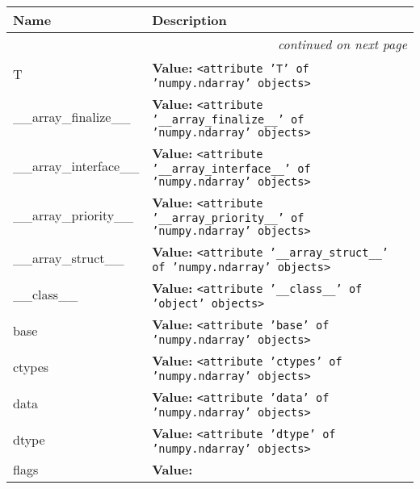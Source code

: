 \begin{longtable}{|p{}|p{}|l}
\cline{1-2}
\cline{1-2} \centering \textbf{Name} & \centering \textbf{Description}& \\
\cline{1-2}
\endhead\cline{1-2}\multicolumn{3}{r}{\small\textit{continued on next page}}\\\endfoot\cline{1-2}
\endlastfoot\raggedright T\- & \raggedright \textbf{Value:} 
{\tt {\textless}attribute 'T' of 'numpy.ndarray' objects{\textgreater}}&\\
\cline{1-2}
\raggedright \_\-\_\-a\-r\-r\-a\-y\-\_\-f\-i\-n\-a\-l\-i\-z\-e\-\_\-\_\- & \raggedright \textbf{Value:} 
{\tt {\textless}attribute '\_\_array\_finalize\_\_' of 'numpy.ndarray' objects{\textgreater}}&\\
\cline{1-2}
\raggedright \_\-\_\-a\-r\-r\-a\-y\-\_\-i\-n\-t\-e\-r\-f\-a\-c\-e\-\_\-\_\- & \raggedright \textbf{Value:} 
{\tt {\textless}attribute '\_\_array\_interface\_\_' of 'numpy.ndarray' objects{\textgreater}}&\\
\cline{1-2}
\raggedright \_\-\_\-a\-r\-r\-a\-y\-\_\-p\-r\-i\-o\-r\-i\-t\-y\-\_\-\_\- & \raggedright \textbf{Value:} 
{\tt {\textless}attribute '\_\_array\_priority\_\_' of 'numpy.ndarray' objects{\textgreater}}&\\
\cline{1-2}
\raggedright \_\-\_\-a\-r\-r\-a\-y\-\_\-s\-t\-r\-u\-c\-t\-\_\-\_\- & \raggedright \textbf{Value:} 
{\tt {\textless}attribute '\_\_array\_struct\_\_' of 'numpy.ndarray' objects{\textgreater}}&\\
\cline{1-2}
\raggedright \_\-\_\-c\-l\-a\-s\-s\-\_\-\_\- & \raggedright \textbf{Value:} 
{\tt {\textless}attribute '\_\_class\_\_' of 'object' objects{\textgreater}}&\\
\cline{1-2}
\raggedright b\-a\-s\-e\- & \raggedright \textbf{Value:} 
{\tt {\textless}attribute 'base' of 'numpy.ndarray' objects{\textgreater}}&\\
\cline{1-2}
\raggedright c\-t\-y\-p\-e\-s\- & \raggedright \textbf{Value:} 
{\tt {\textless}attribute 'ctypes' of 'numpy.ndarray' objects{\textgreater}}&\\
\cline{1-2}
\raggedright d\-a\-t\-a\- & \raggedright \textbf{Value:} 
{\tt {\textless}attribute 'data' of 'numpy.ndarray' objects{\textgreater}}&\\
\cline{1-2}
\raggedright d\-t\-y\-p\-e\- & \raggedright \textbf{Value:} 
{\tt {\textless}attribute 'dtype' of 'numpy.ndarray' objects{\textgreater}}&\\
\cline{1-2}
\raggedright f\-l\-a\-g\-s\- & \raggedright \textbf{Value:} 

\end{longtable}
